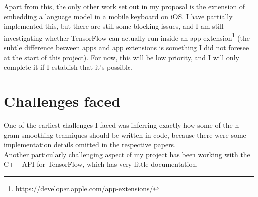 \documentclass[a4paper, 12pt]{article}
\begin{document}
Apart from this, the only other work set out in my proposal is the extension of embedding a language model in a mobile keyboard on iOS. I have partially implemented this, but there are still some blocking issues, and I am still investigating whether TensorFlow can actually run inside an app extension\footnote{\href{https://developer.apple.com/app-extensions/}{https://developer.apple.com/app-extensions/}} (the subtle difference between apps and app extensions is something I did not foresee at the start of this project). For now, this will be low priority, and I will only complete it if I establish that it's possible.

\section*{Challenges faced}

One of the earliest challenges I faced was inferring exactly how some of the n-gram smoothing techniques should be written in code, because there were some implementation details omitted in the respective papers. \\

Another particularly challenging aspect of my project has been working with the C++ API for TensorFlow, which has very little documentation.



\end{document}
